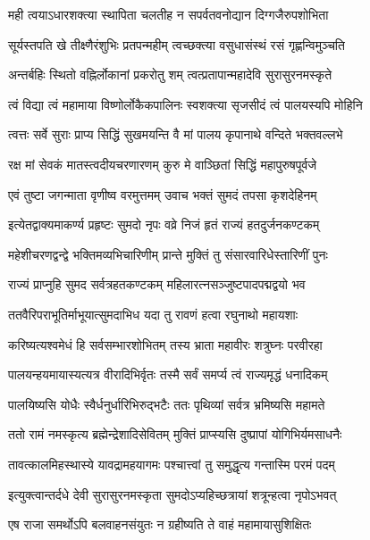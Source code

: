 \twolineshloka
{मही त्वयाऽधारशक्त्या स्थापिता चलतीह न}
{सपर्वतवनोद्यान दिग्गजैरुपशोभिता}%

\twolineshloka
{सूर्यस्तपति खे तीक्ष्णैरंशुभिः प्रतपन्महीम्}
{त्वच्छक्त्या वसुधासंस्थं रसं गृह्णन्विमुञ्चति}%

\twolineshloka
{अन्तर्बहिः स्थितो वह्निर्लोकानां प्रकरोतु शम्}
{त्वत्प्रतापान्महादेवि सुरासुरनमस्कृते}%

\twolineshloka
{त्वं विद्या त्वं महामाया विष्णोर्लोकैकपालिनः}
{स्वशक्त्या सृजसीदं त्वं पालयस्यपि मोहिनि}%

\twolineshloka
{त्वत्तः सर्वे सुराः प्राप्य सिद्धिं सुखमयन्ति वै}
{मां पालय कृपानाथे वन्दिते भक्तवल्लभे}%

\twolineshloka
{रक्ष मां सेवकं मातस्त्वदीयचरणारणम्}
{कुरु मे वाञ्छितां सिद्धिं महापुरुषपूर्वजे}%


\twolineshloka
{एवं तुष्टा जगन्माता वृणीष्व वरमुत्तमम्}
{उवाच भक्तं सुमदं तपसा कृशदेहिनम्}%

\twolineshloka
{इत्येतद्वाक्यमाकर्ण्य प्रहृष्टः सुमदो नृपः}
{वव्रे निजं हृतं राज्यं हतदुर्जनकण्टकम्}%

\twolineshloka
{महेशीचरणद्वन्द्वे भक्तिमव्यभिचारिणीम्}
{प्रान्ते मुक्तिं तु संसारवारिधेस्तारिणीं पुनः}%


\twolineshloka
{राज्यं प्राप्नुहि सुमद सर्वत्रहतकण्टकम्}
{महिलारत्नसञ्जुष्टपादपद्मद्वयो भव}%

\twolineshloka
{ततवैरिपराभूतिर्माभूयात्सुमदाभिध}
{यदा तु रावणं हत्वा रघुनाथो महायशाः}%

\twolineshloka
{करिष्यत्यश्वमेधं हि सर्वसम्भारशोभितम्}
{तस्य भ्राता महावीरः शत्रुघ्नः परवीरहा}%

\twolineshloka
{पालयन्हयमायास्यत्यत्र वीरादिभिर्वृतः}
{तस्मै सर्वं समर्प्य त्वं राज्यमृद्धं धनादिकम्}%

\twolineshloka
{पालयिष्यसि योधैः स्वैर्धनुर्धारिभिरुद्भटैः}
{ततः पृथिव्यां सर्वत्र भ्रमिष्यसि महामते}%

\twolineshloka
{ततो रामं नमस्कृत्य ब्रह्मेन्द्रेशादिसेवितम्}
{मुक्तिं प्राप्स्यसि दुष्प्रापां योगिभिर्यमसाधनैः}%

\twolineshloka
{तावत्कालमिहस्थास्ये यावद्रामहयागमः}
{पश्चात्त्वां तु समुद्धृत्य गन्तास्मि परमं पदम्}%

\twolineshloka
{इत्युक्त्वान्तर्दधे देवी सुरासुरनमस्कृता}
{सुमदोऽप्यहिच्छत्रायां शत्रून्हत्वा नृपोऽभवत्}%

\twolineshloka
{एष राजा समर्थोऽपि बलवाहनसंयुतः}
{न ग्रहीष्यति ते वाहं महामायासुशिक्षितः}%

